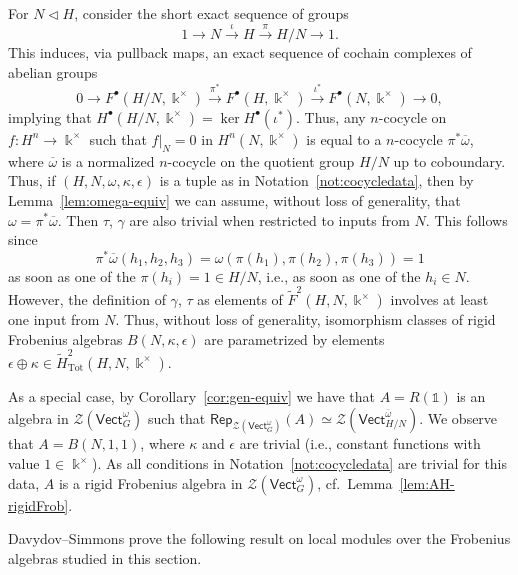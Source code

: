 \documentclass[pdftex]{sigma}
\numberwithin{equation}{section}
\newcommand{\ov}[1]{\overline{#1}}
\newcommand{\wF}{\widetilde{F}}
\newcommand{\one}{\mathds{1}}
\newcommand{\Tot}{\mathrm{Tot}}
\newcommand{\Rep}{\mathsf{Rep}}
\newcommand{\Vect}{\mathsf{Vect}}
\newcommand{\cZ}{\mathcal{Z}}
\begin{document}
\begin{Remark}\label{rem:simplify}
For $N\triangleleft H$, consider the short exact sequence of groups
\[1\to N\xrightarrow{\iota}H\xrightarrow{\pi} H/N\to 1.\] This induces, via pullback maps, an exact sequence of cochain complexes of abelian groups
\[0\to F^\bullet(H/N,\Bbbk^\times)\xrightarrow{\pi^*} F^\bullet(H,\Bbbk^\times)\xrightarrow{\iota^*} F^\bullet(N,\Bbbk^\times)\to 0,\]
implying that
$H^\bullet(H/N,\Bbbk^\times)=\ker H^\bullet(\iota^*)$. Thus, any $n$-cocycle on $f\colon H^n\to \Bbbk^\times$ such that $ f|_N=0$ in $H^n(N,\Bbbk^\times)$ is equal to a $n$-cocycle $\pi^* \ov{\omega}$, where $\ov{\omega}$ is a normalized $n$-cocycle on the quotient group $H/N$ up to coboundary.
Thus, if $(H,N,\omega,\kappa, \epsilon)$ is a tuple as in Notation~\ref{not:cocycledata}, then by Lemma~\ref{lem:omega-equiv} we can assume, without loss of generality, that $\omega=\pi^*\ov{\omega}$. Then $\tau$, $\gamma$ are also trivial when restricted to inputs from $N$. This follows since
\[\pi^*\ov{\omega}(h_1,h_2,h_3)=\omega(\pi(h_1),\pi(h_2),\pi(h_3))=1\]
as soon as one of the $\pi(h_i)=1\in H/N$, i.e., as soon as one of the $h_i\in N$. However, the definition of $\gamma$, $\tau$ as elements of $\wF^2(H,N,\Bbbk^\times)$ involves at least one input from $N$.
Thus, without loss of generality, isomorphism classes of rigid Frobenius algebras $B(N,\kappa,\epsilon)$ are parametrized by elements $\epsilon\oplus \kappa\in \tilde{H}^2_{\Tot}(H,N,\Bbbk^\times)$.

As a special case, by Corollary~\ref{cor:gen-equiv} we have that $A=R(\one)$ is an algebra in $\cZ(\Vect_G^{\omega})$ such that $\Rep_{\cZ(\Vect_G^{\omega})}(A)\simeq \cZ(\Vect_{H/N}^{\ov{\omega}})$. We observe that
$A=B(N,1,1)$, where $\kappa$ and $\epsilon$ are trivial (i.e., constant functions with value $1\in \Bbbk^\times$). As all conditions in Notation~\ref{not:cocycledata} are trivial for this data, $A$ is a rigid Frobenius algebra in $\cZ(\Vect_G^{\omega})$, cf.\ Lemma~\ref{lem:AH-rigidFrob}.
\end{Remark}

Davydov--Simmons prove the following result on local modules over the Frobenius algebras studied in this section.
\end{document}
